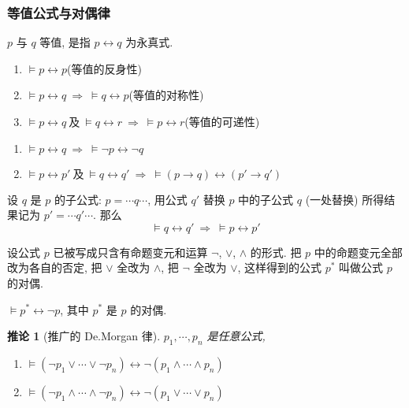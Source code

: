 \documentclass[
    color=black,
    device=normal,
    lang=cn
]{elegantnote}
\newtheorem{deduction}{推论}[subsection]
\begin{document}
\subsubsection{等值公式与对偶律}
\begin{definition}[等值公式]
    $p$ 与 $q$ 等值, 是指 $p\leftrightarrow q$ 为永真式.
\end{definition}
\begin{proposition}
    \hfill
    \begin{enumerate}[label = $\arabic*^\circ$, topsep = -1em]
        \item $\vDash p \leftrightarrow p$\hfill (等值的反身性)
        \item $\vDash p \leftrightarrow q \ \Rightarrow\ \vDash q\leftrightarrow p$\hfill (等值的对称性)
        \item $\vDash p \leftrightarrow q\ \text{及}\ \vDash q \leftrightarrow r\ \Rightarrow\ \vDash p \leftrightarrow r$\hfill (等值的可递性)
    \end{enumerate}
\end{proposition}
\begin{proposition}
    \hfill
    \begin{enumerate}[label = $\arabic*^\circ$, topsep = -1em]
        \item $\vDash p\leftrightarrow q\ \Rightarrow\ \vDash\lnot p\leftrightarrow \lnot q$
        \item $\vDash p\leftrightarrow p'\ \text{及}\ \vDash q\leftrightarrow q'\ \Rightarrow\ \vDash(p\to q)\leftrightarrow(p'\to q')$
    \end{enumerate}
\end{proposition}
\begin{theorem}[子公式等值可替换性]
    设 $q$ 是 $p$ 的子公式: $p=\cdots q\cdots$, 用公式 $q'$ 替换 $p$ 中的子公式 $q$ (一处替换) 所得结果记为 $p'=\cdots q'\cdots$. 那么
    $$
        \vDash q\leftrightarrow q'\ \Rightarrow\ \vDash p\leftrightarrow p'
    $$
\end{theorem}
\begin{definition}[公式的对偶]
    设公式 $p$ 已被写成只含有命题变元和运算 $\lnot$, $\lor$, $\land$ 的形式. 把 $p$ 中的命题变元全部改为各自的否定, 把 $\lor$ 全改为 $\land$, 把 $\lnot$ 全改为 $\lor$, 这样得到的公式 $p^*$ 叫做公式 $p$ 的对偶.
\end{definition}
\begin{theorem}[对偶律]
    $\vDash p^*\leftrightarrow \lnot p$, 其中 $p^*$ 是 $p$ 的对偶.
\end{theorem}
\begin{deduction}[推广的 De.Morgan 律]
    $p_1,\cdots,p_n$ 是任意公式,
    \begin{enumerate}[label = $\arabic*^\circ$, topsep = -1em]
        \item $\vDash (\lnot p_1\lor\cdots\lor\lnot p_n)\leftrightarrow\lnot (p_1\land\cdots\land p_n)$
        \item $\vDash (\lnot p_1\land\cdots\land\lnot p_n)\leftrightarrow\lnot (p_1\lor\cdots\lor p_n)$
    \end{enumerate}
\end{deduction}
\end{document}

